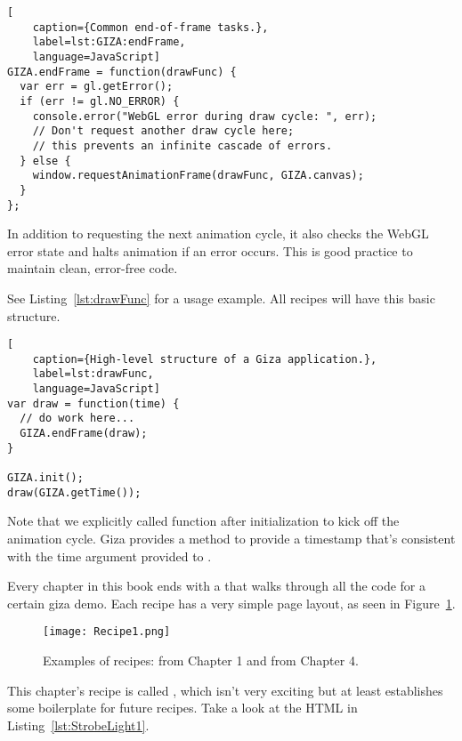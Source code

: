 \begin{lstlisting}[
    caption={Common end-of-frame tasks.},
    label=lst:GIZA:endFrame,
    language=JavaScript]
GIZA.endFrame = function(drawFunc) {
  var err = gl.getError();
  if (err != gl.NO_ERROR) {
    console.error("WebGL error during draw cycle: ", err);
    // Don't request another draw cycle here;
    // this prevents an infinite cascade of errors.
  } else {
    window.requestAnimationFrame(drawFunc, GIZA.canvas);
  }
};
\end{lstlisting} 

In addition to requesting the next animation cycle, it also checks the WebGL error state and halts animation if an error occurs.  This is good practice to maintain clean, error-free code.

See Listing~\ref{lst:drawFunc} for a usage example.  All recipes will have this basic structure.

\begin{lstlisting}[
    caption={High-level structure of a Giza application.},
    label=lst:drawFunc,
    language=JavaScript]
var draw = function(time) {
  // do work here...
  GIZA.endFrame(draw);
}

GIZA.init();
draw(GIZA.getTime());
\end{lstlisting}

Note that we explicitly called  function after initialization to kick off the animation cycle.  Giza provides a  method to provide a timestamp that's consistent with the time argument provided to .


Every chapter in this book ends with a  that walks through all the code for a certain giza demo.  Each recipe has a very simple page layout, as seen in Figure~\ref{fig:Recipe1}.

\begin{figure}[htb]\centering
  \texttt{[image: Recipe1.png]}
  \caption{Examples of recipes:  from Chapter 1 and  from Chapter 4.}
  \label{fig:Recipe1}
\end{figure}

This chapter's recipe is called , which isn't very exciting but at least establishes some boilerplate for future recipes.  Take a look at the HTML in Listing~\ref{lst:StrobeLight1}.

